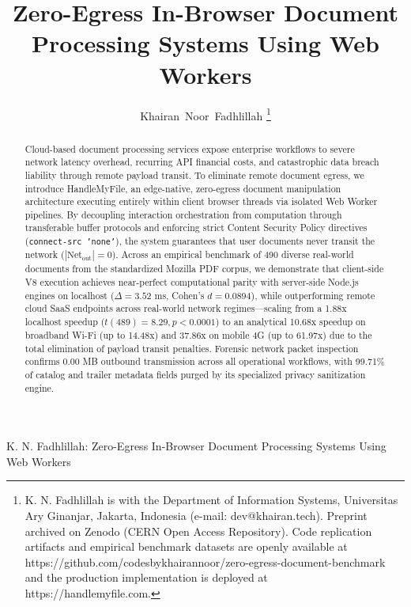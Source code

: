 \documentclass[journal]{IEEEtran}
\begin{document}
\flushbottom

\title{Zero-Egress In-Browser Document Processing Systems Using Web Workers}

\author{Khairan~Noor~Fadhlillah%
\thanks{K. N. Fadhlillah is with the Department of Information Systems, Universitas Ary Ginanjar, Jakarta, Indonesia (e-mail: dev@khairan.tech). Preprint archived on Zenodo (CERN Open Access Repository). Code replication artifacts and empirical benchmark datasets are openly available at https://github.com/codesbykhairannoor/zero-egress-document-benchmark and the production implementation is deployed at https://handlemyfile.com.}%
}

%
{K. N. Fadhlillah: Zero-Egress In-Browser Document Processing Systems Using Web Workers}

\maketitle

\begin{abstract}
Cloud-based document processing services expose enterprise workflows to severe network latency overhead, recurring API financial costs, and catastrophic data breach liability through remote payload transit. To eliminate remote document egress, we introduce HandleMyFile, an edge-native, zero-egress document manipulation architecture executing entirely within client browser threads via isolated Web Worker pipelines. By decoupling interaction orchestration from computation through transferable buffer protocols and enforcing strict Content Security Policy directives (\texttt{connect-src 'none'}), the system guarantees that user documents never transit the network ($|\text{Net}_{\text{out}}| = 0$). Across an empirical benchmark of 490 diverse real-world documents from the standardized Mozilla PDF corpus, we demonstrate that client-side V8 execution achieves near-perfect computational parity with server-side Node.js engines on localhost ($\Delta = 3.52$ ms, Cohen's $d = 0.0894$), while outperforming remote cloud SaaS endpoints across real-world network regimes---scaling from a 1.88x localhost speedup ($t(489) = 8.29, p < 0.0001$) to an analytical 10.68x speedup on broadband Wi-Fi (up to 14.48x) and 37.86x on mobile 4G (up to 61.97x) due to the total elimination of payload transit penalties. Forensic network packet inspection confirms 0.00 MB outbound transmission across all operational workflows, with 99.71\% of catalog and trailer metadata fields purged by its specialized privacy sanitization engine.
\end{abstract}
\end{document}
